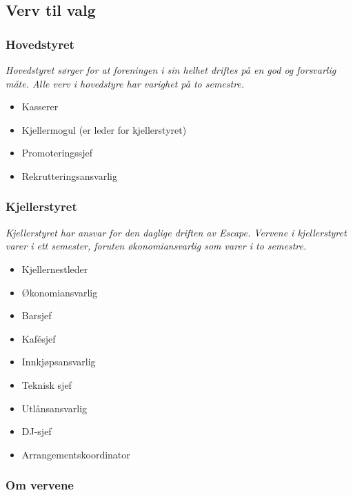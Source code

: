 \documentclass[12pt, norsk, a4paper]{proc}
\providecommand{\tightlist}{%
  \setlength{\itemsep}{0pt}\setlength{\parskip}{0pt}}
\begin{document}
\hypertarget{verv-til-valg}{%
\subsection*{Verv til valg}\label{verv-til-valg}}

\hypertarget{hovedstyret}{%
\subsubsection*{Hovedstyret}\label{hovedstyret}}

\emph{Hovedstyret sørger for at foreningen i sin helhet driftes på en
god og forsvarlig måte. Alle verv i hovedstyre har varighet på to
semestre.}

\begin{itemize}
\tightlist
\item
  Kasserer
\item
  Kjellermogul (er leder for kjellerstyret)
\item
  Promoteringssjef
\item
  Rekrutteringsansvarlig
\end{itemize}

\hypertarget{kjellerstyret}{%
\subsubsection*{Kjellerstyret}\label{kjellerstyret}}

\emph{Kjellerstyret har ansvar for den daglige driften av Escape.
Vervene i kjellerstyret varer i ett semester, foruten økonomiansvarlig 
som varer i to semestre.}

\begin{itemize}
\tightlist
\item
  Kjellernestleder
\item
  Økonomiansvarlig
\item
  Barsjef
\item
  Kafésjef
\item
  Innkjøpsansvarlig
\item
  Teknisk sjef
\item
  Utlånsansvarlig
\item
  DJ-sjef
\item
  Arrangementskoordinator
\end{itemize}

\hypertarget{om-vervene}{%
\subsubsection*{Om vervene}\label{om-vervene}}
\end{document}
